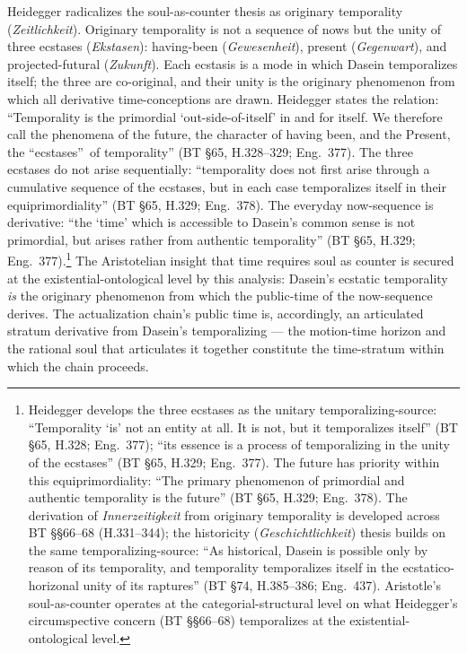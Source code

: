 \documentclass{article}
\begin{document}
Heidegger radicalizes the soul-as-counter thesis as originary temporality (\textit{Zeitlichkeit}). Originary temporality is not a sequence of nows but the unity of three ecstases (\textit{Ekstasen}): having-been (\textit{Gewesenheit}), present (\textit{Gegenwart}), and projected-futural (\textit{Zukunft}). Each ecstasis is a mode in which Dasein temporalizes itself; the three are co-original, and their unity is the originary phenomenon from which all derivative time-conceptions are drawn. Heidegger states the relation: ``Temporality is the primordial `out-side-of-itself' in and for itself. We therefore call the phenomena of the future, the character of having been, and the Present, the \textquotedblleft ecstases\textquotedblright\ of temporality'' (BT \S 65, H.328--329; Eng.~377). The three ecstases do not arise sequentially: ``temporality does not first arise through a cumulative sequence of the ecstases, but in each case temporalizes itself in their equiprimordiality'' (BT \S 65, H.329; Eng.~378). The everyday now-sequence is derivative: ``the `time' which is accessible to Dasein's common sense is not primordial, but arises rather from authentic temporality'' (BT \S 65, H.329; Eng.~377).\footnote{Heidegger develops the three ecstases as the unitary temporalizing-source: ``Temporality `is' not an entity at all. It is not, but it temporalizes itself'' (BT §65, H.328; Eng.~377); ``its essence is a process of temporalizing in the unity of the ecstases'' (BT §65, H.329; Eng.~377). The future has priority within this equiprimordiality: ``The primary phenomenon of primordial and authentic temporality is the future'' (BT §65, H.329; Eng.~378). The derivation of \textit{Innerzeitigkeit} from originary temporality is developed across BT §§66--68 (H.331--344); the historicity (\textit{Geschichtlichkeit}) thesis builds on the same temporalizing-source: ``As historical, Dasein is possible only by reason of its temporality, and temporality temporalizes itself in the ecstatico-horizonal unity of its raptures'' (BT §74, H.385--386; Eng.~437). Aristotle's soul-as-counter operates at the categorial-structural level on what Heidegger's circumspective concern (BT §§66--68) temporalizes at the existential-ontological level.} The Aristotelian insight that time requires soul as counter is secured at the existential-ontological level by this analysis: Dasein's ecstatic temporality \textit{is} the originary phenomenon from which the public-time of the now-sequence derives. The actualization chain's public time is, accordingly, an articulated stratum derivative from Dasein's temporalizing --- the motion-time horizon and the rational soul that articulates it together constitute the time-stratum within which the chain proceeds.
\end{document}
